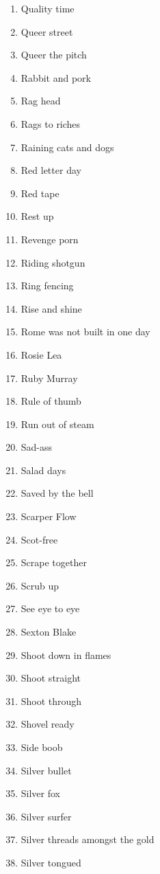 \begin{enumerate}
        \item  Quality time
        \item  Queer street
        \item  Queer the pitch
        \item  Rabbit and pork
        \item  Rag head
        \item  Rags to riches
        \item  Raining cats and dogs
        \item  Red letter day
        \item  Red tape
        \item  Rest up
        \item  Revenge porn
        \item  Riding shotgun
        \item  Ring fencing
        \item  Rise and shine
        \item  Rome was not built in one day
        \item  Rosie Lea
        \item  Ruby Murray
        \item  Rule of thumb
        \item  Run out of steam
        \item  Sad-ass
        \item  Salad days
        \item  Saved by the bell
        \item  Scarper Flow
        \item  Scot-free
        \item  Scrape together
        \item  Scrub up
        \item  See eye to eye
        \item  Sexton Blake
        \item  Shoot down in flames
        \item  Shoot straight
        \item  Shoot through
        \item  Shovel ready
        \item  Side boob
        \item  Silver bullet
        \item  Silver fox
        \item  Silver surfer
        \item  Silver threads amongst the gold
        \item  Silver tongued

\end{enumerate}
